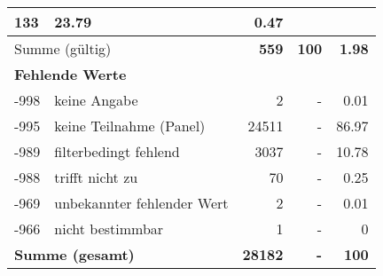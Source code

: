 \begin{longtable}{lXrrr}
       \num{133} &
       \num[round-mode=places,round-precision=2]{23,79} &
         \num[round-mode=places,round-precision=2]{0,47} \\
     \midrule
     \multicolumn{2}{l}{Summe (gültig)} &
       \textbf{\num{559}} &
     \textbf{100} &
       \textbf{\num[round-mode=places,round-precision=2]{1,98}} \\
     \multicolumn{5}{l}{\textbf{Fehlende Werte}}\\
       -998 &
       keine Angabe &
         \num{2} &
        - &
         \num[round-mode=places,round-precision=2]{0,01} \\
       -995 &
       keine Teilnahme (Panel) &
         \num{24511} &
        - &
         \num[round-mode=places,round-precision=2]{86,97} \\
       -989 &
       filterbedingt fehlend &
         \num{3037} &
        - &
         \num[round-mode=places,round-precision=2]{10,78} \\
       -988 &
       trifft nicht zu &
         \num{70} &
        - &
         \num[round-mode=places,round-precision=2]{0,25} \\
       -969 &
       unbekannter fehlender Wert &
         \num{2} &
        - &
         \num[round-mode=places,round-precision=2]{0,01} \\
       -966 &
       nicht bestimmbar &
         \num{1} &
        - &
         \num[round-mode=places,round-precision=2]{0} \\
     \midrule
     \multicolumn{2}{l}{\textbf{Summe (gesamt)}} &
          \textbf{\num{28182}} &
        \textbf{-} &
        \textbf{100} \\
     \bottomrule
     \end{longtable}
     
